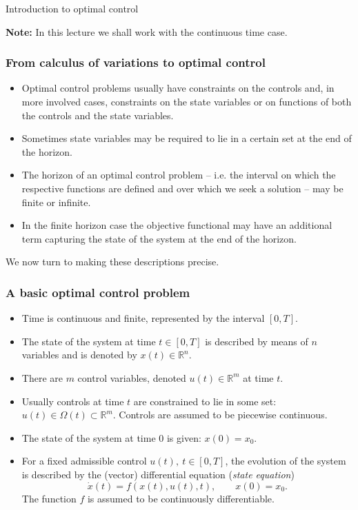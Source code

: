 \documentclass[10pt]{beamer}
\theoremstyle{definition}
\begin{document}
\begin{section}{Introduction to optimal control}
\begin{frame}[fragile]
\textbf{Note:} In this lecture we shall work with the continuous time case.
\end{frame}

\begin{frame}[fragile]
\frametitle{From calculus of variations to optimal control}
\begin{itemize}\itemsep1em
\item Optimal control problems usually have constraints on the controls and, in more involved cases, constraints on the state variables or on functions of both the controls and the state variables.
\item Sometimes state variables may be required to lie in a certain set at the end of the horizon.
\item The horizon of an optimal control problem -- i.e. the interval on which the respective functions are defined and over which we seek a solution -- may be finite or infinite.
\item In the finite horizon case the objective functional may have an additional term capturing the state of the system at the end of the horizon.
\end{itemize} \bigskip \pause

\alert{We now turn to making these descriptions precise.}
\end{frame}

\begin{frame}[fragile]
\frametitle{A basic optimal control problem}
\begin{itemize}\itemsep1em
\item Time is continuous and finite, represented by the interval $ [0,T] $.
\item The state of the system at time $ t \in [0,T] $ is described by means of $ n $ variables and is denoted by $ x(t)\in \mathbb{R}^n $.
\item There are $ m $ control variables, denoted $ u(t)\in \mathbb{R}^m $ at time $ t $. 
\item Usually controls at time $ t $ are constrained to lie in some set: $ u(t)\in \Omega (t) \subset \mathbb{R}^m $. Controls are assumed to be piecewise continuous.
\item The state of the system at time $ 0 $ is given: $ x(0)=x_0 $.
\item For a fixed admissible control $ u(t),~t\in [0,T] $, the evolution of the system is described by the (vector) differential equation (\emph{state equation})  \begin{equation}
\dot{x}(t)=f(x(t),u(t),t),\qquad x(0)=x_0.
\label{eq:state}
\end{equation} The function $ f $ is assumed to be continuously differentiable.
\end{itemize}
\end{frame}


\end{section}
\end{document}
